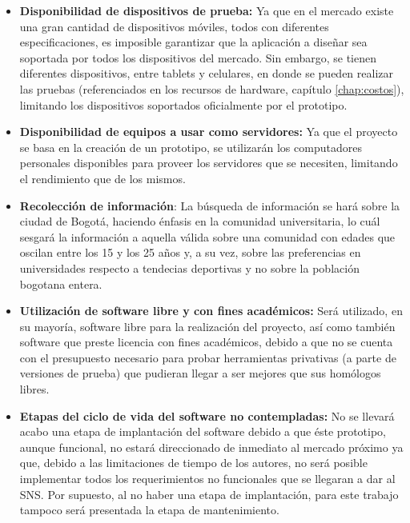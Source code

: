 \begin{itemize}
  \item \textbf{Disponibilidad de dispositivos de prueba:} Ya que en el mercado existe una gran cantidad de dispositivos móviles, todos con diferentes especificaciones, es imposible garantizar que la aplicación a diseñar sea soportada por todos los dispositivos del mercado. Sin embargo, se tienen diferentes dispositivos, entre tablets y celulares, en donde se pueden realizar las pruebas (referenciados en los recursos de hardware, capítulo \ref{chap:costos}), limitando los dispositivos soportados oficialmente por el prototipo.

  \item \textbf{Disponibilidad de equipos a usar como servidores:} Ya que el proyecto se basa en la creación de un prototipo, se utilizarán los computadores personales disponibles para proveer los servidores que se necesiten, limitando el rendimiento que de los mismos.
  
  \item \textbf{Recolección de información}: La búsqueda de información se hará sobre la ciudad de Bogotá, haciendo énfasis en la comunidad universitaria, lo cuál sesgará la información a aquella válida sobre una comunidad con edades que oscilan entre los 15 y los 25 años y, a su vez, sobre las preferencias en universidades respecto a tendecias deportivas y no sobre la población bogotana entera.
  
  \item \textbf{Utilización de software libre y con fines académicos:} Será utilizado, en su mayoría, software libre para la realización del proyecto, así como también software que preste licencia con fines académicos, debido a que no se cuenta con el presupuesto necesario para probar herramientas privativas (a parte de versiones de prueba) que pudieran llegar a ser mejores que sus homólogos libres.
  
  \item \textbf{Etapas del ciclo de vida del software no contempladas:} No se llevará acabo una etapa de implantación del software debido a que éste prototipo, aunque funcional, no estará direccionado de inmediato al mercado próximo ya que, debido a las limitaciones de tiempo de los autores, no será posible implementar todos los requerimientos no funcionales que se llegaran a dar al SNS. Por supuesto, al no haber una etapa de implantación, para este trabajo tampoco será presentada la etapa de mantenimiento.
\end{itemize}
